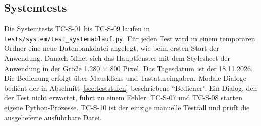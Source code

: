 \subsection{Systemtests}\label{sec:protokoll-system}
Die Systemtests TC-S-01 bis TC-S-09 laufen in \texttt{tests/system/test\_systemablauf.py}. Für jeden Test wird in einem temporären Ordner eine neue Datenbankdatei angelegt, wie beim ersten Start der Anwendung. Danach öffnet sich das Hauptfenster mit dem Stylesheet der Anwendung in der Größe 1.280 $\times$ 800 Pixel. Das Tagesdatum ist der 18.11.2026. Die Bedienung erfolgt über Mausklicks und Tastatureingaben. Modale Dialoge bedient der in Abschnitt~\ref{sec:teststufen} beschriebene \enquote{Bediener}. Ein Dialog, den der Test nicht erwartet, führt zu einem Fehler. TC-S-07 und TC-S-08 starten eigene Python-Prozesse. TC-S-10 ist der einzige manuelle Testfall und prüft die ausgelieferte ausführbare Datei.

